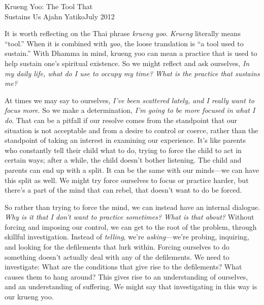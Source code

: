 {Krueng Yoo: The Tool That\\Sustains Us}
{Ajahn Yatiko}{July 2012}

It is worth reflecting on the Thai phrase \emph{krueng yoo}. 
\emph{Krueng} literally means ``tool.'' When it is combined with 
\emph{yoo}, the loose translation is ``a tool used to sustain.'' With 
Dhamma in mind, krueng yoo can mean a practice that is used to help 
sustain one's spiritual existence. So we might reflect and ask 
ourselves, \emph{In my daily life, what do I use to occupy my time? 
What is the practice that sustains me?}

At times we may say to ourselves, \emph{I've been scattered lately, and 
I really want to focus more}. So we make a determination, \emph{I'm 
going to be more focused in what I do}. That can be a pitfall if our 
resolve comes from the standpoint that our situation is not acceptable 
and from a desire to control or coerce, rather than the standpoint of 
taking an interest in examining our experience. It's like parents who 
constantly tell their child what to do, trying to force the child to 
act in certain ways; after a while, the child doesn't bother listening. 
The child and parents can end up with a split. It can be the same with 
our minds---we can have this split as well. We might try force 
ourselves to focus or practice harder, but there's a part of the mind 
that can rebel, that doesn't want to do be forced.

So rather than trying to force the mind, we can instead have an 
internal dialogue. \emph{Why is it that I don't want to practice 
sometimes? What is that about?} Without forcing and imposing our 
control, we can get to the root of the problem, through skillful 
investigation. Instead of \emph{telling}, we're \emph{asking}---we're 
probing, inquiring, and looking for the defilements that lurk within. 
Forcing ourselves to do something doesn't actually deal with any of the 
defilements. We need to investigate: What are the conditions that give 
rise to the defilements? What causes them to hang around? This gives 
rise to an understanding of ourselves, and an understanding of 
suffering. We might say that investigating in this way is our krueng 
yoo.


